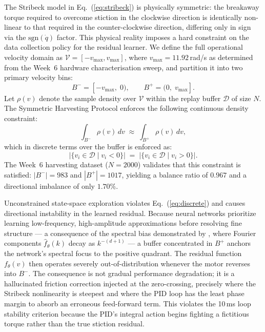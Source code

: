 \documentclass[11pt, a4paper]{article}
\begin{document}
The Stribeck model in Eq.~(\ref{eq:stribeck}) is physically symmetric: the
breakaway torque required to overcome stiction in the clockwise direction
is identically non-linear to that required in the counter-clockwise
direction, differing only in sign via the $\mathrm{sgn}(\dot{q})$ factor.
This physical reality imposes a hard constraint on the data collection
policy for the residual learner. We define the full operational velocity
domain as $\mathcal{V} = [-v_{\max}, v_{\max}]$, where $v_{\max} = 11.92$\,rad/s
as determined from the Week~6 hardware characterisation sweep, and
partition it into two primary velocity bins:
\begin{equation}
    B^- = [-v_{\max},\; 0), \qquad B^+ = (0,\; v_{\max}].
    \label{eq:bins}
\end{equation}
Let $\rho(v)$ denote the sample density over $\mathcal{V}$ within the
replay buffer $\mathcal{D}$ of size $N$. The Symmetric Harvesting Protocol
enforces the following continuous density constraint:
\begin{equation}
    \int_{B^-} \rho(v)\, dv \;\approx\; \int_{B^+} \rho(v)\, dv,
    \label{eq:density}
\end{equation}
which in discrete terms over the buffer is enforced as:
\begin{equation}
    \bigl|\{ v_i \in \mathcal{D} \mid v_i < 0 \}\bigr|
    \;=\;
    \bigl|\{ v_i \in \mathcal{D} \mid v_i > 0 \}\bigr|.
    \label{eq:discrete}
\end{equation}
The Week~6 harvesting dataset ($N = 2000$) validates that this constraint
is satisfied: $|B^-| = 983$ and $|B^+| = 1017$, yielding a balance ratio
of $0.967$ and a directional imbalance of only $1.70\%$.

Unconstrained state-space exploration violates Eq.~(\ref{eq:discrete}) and
causes directional instability in the learned residual. Because neural
networks prioritize learning low-frequency, high-amplitude approximations
before resolving fine structure --- a consequence of the spectral bias
demonstrated by \citet{rahaman2019spectralbiasneuralnetworks}, where
Fourier components $\hat{f}_\theta(k)$ decay as $k^{-(d+1)}$ --- a buffer
concentrated in $B^+$ anchors the network's spectral focus to the positive
quadrant. The residual function $f_\theta(v)$ then operates severely
out-of-distribution whenever the motor reverses into $B^-$. The
consequence is not gradual performance degradation; it is a hallucinated
friction correction injected at the zero-crossing, precisely where the
Stribeck nonlinearity is steepest and where the PID loop has the least
phase margin to absorb an erroneous feed-forward term. This violates the
10\,ms loop stability criterion because the PID's integral action begins
fighting a fictitious torque rather than the true stiction residual.
\end{document}
